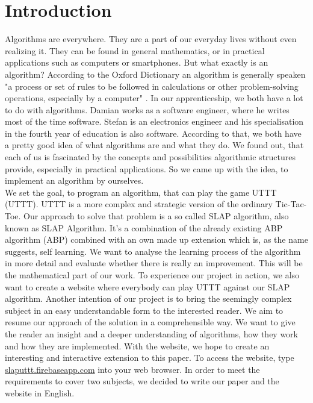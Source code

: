 \section{Introduction}
Algorithms are everywhere. They are a part of our everyday lives without even realizing it. They can be found in general mathematics, or in practical applications such as  computers or smartphones. But what exactly is an algorithm? According to the Oxford Dictionary an algorithm is generally speaken "a process or set of rules to be followed in calculations or other problem-solving operations, especially by a computer" \cite{web:oxforddictionaries2018}.
In our apprenticeship, we both have a lot to do with algorithms. Damian works as a software engineer, where he writes most of the time software. Stefan is an electronics engineer and his specialisation in the fourth year of education is also software. According to that, we both have a pretty good idea of what algorithms are and what they do. We found out, that each of us is fascinated by the concepts and possibilities algorithmic structures provide, especially in practical applications. So we came up with the idea, to implement an algorithm by ourselves. \\

We set the goal, to program an algorithm, that can play the game \acl{UTTT} (\ac{UTTT}). \ac{UTTT} is a more complex and strategic version of the ordinary Tic-Tac-Toe. 
Our approach to solve that problem is a so called \acl {SLAP}  algorithm, also known as \ac{SLAP} Algorithm. It's a combination of the already existing \acl{ABP} algorithm (\ac{ABP}) combined with an own made up extension which is, as the name suggests, self learning. We want to analyse the learning process of the algorithm in more detail and evaluate whether there is really an improvement. This will be the mathematical part of our work.
To experience our project in action, we also want to create a website where everybody can play \ac{UTTT}  against our \ac{SLAP} algorithm.
Another intention of our project is to bring the seemingly complex subject in an easy understandable form to the interested reader. We aim to resume our approach of the solution in a comprehensible way. We want to give the reader an insight and a deeper understanding of algorithms, how they work and how they are implemented. With the website, we hope to create an interesting and interactive extension to this paper. To access the website, type \href{https://slaputtt.firebaseapp.com/}{slaputtt.firebaseapp.com} into your web browser. In order to meet the requirements to cover two subjects, we decided to write our paper and the website in English. \\

